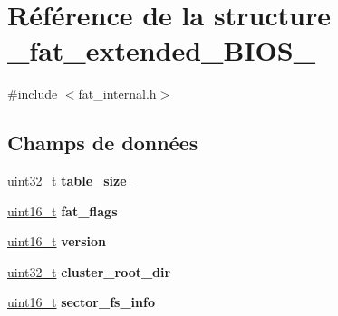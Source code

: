 \hypertarget{struct__fat__extended__BIOS__32}{\section{Référence de la structure \-\_\-fat\-\_\-extended\-\_\-\-B\-I\-O\-S\-\_}
\label{struct__fat__extended__BIOS__32}
}


{\ttfamily \#include $<$fat\-\_\-internal.\-h$>$}

\subsection*{Champs de données}
\begin{DoxyCompactItemize}
\item 
\hypertarget{struct__fat__extended__BIOS__32_afe9918174f4b717fe9ba858b792b6b76}{\hyperlink{kernel_2include_2types_8h_a33594304e786b158f3fb30289278f5af}{uint32\-\_\-t} {\bfseries table\-\_\-size\-\_}}\label{struct__fat__extended__BIOS__32_afe9918174f4b717fe9ba858b792b6b76}

\item 
\hypertarget{struct__fat__extended__BIOS__32_a58bc295c5eec01f9daec08d84340817e}{\hyperlink{kernel_2include_2types_8h_adf4d876453337156dde61095e1f20223}{uint16\-\_\-t} {\bfseries fat\-\_\-flags}}\label{struct__fat__extended__BIOS__32_a58bc295c5eec01f9daec08d84340817e}

\item 
\hypertarget{struct__fat__extended__BIOS__32_a9eb3b046449e1e1c868e1ecb1d6a9fe2}{\hyperlink{kernel_2include_2types_8h_adf4d876453337156dde61095e1f20223}{uint16\-\_\-t} {\bfseries version}}\label{struct__fat__extended__BIOS__32_a9eb3b046449e1e1c868e1ecb1d6a9fe2}

\item 
\hypertarget{struct__fat__extended__BIOS__32_a78cf2bb3768b41a3b054d6c71d5c61e7}{\hyperlink{kernel_2include_2types_8h_a33594304e786b158f3fb30289278f5af}{uint32\-\_\-t} {\bfseries cluster\-\_\-root\-\_\-dir}}\label{struct__fat__extended__BIOS__32_a78cf2bb3768b41a3b054d6c71d5c61e7}

\item 
\hypertarget{struct__fat__extended__BIOS__32_a38e8b2efc3921f696d435b878fc85007}{\hyperlink{kernel_2include_2types_8h_adf4d876453337156dde61095e1f20223}{uint16\-\_\-t} {\bfseries sector\-\_\-fs\-\_\-info}}\label{struct__fat__extended__BIOS__32_a38e8b2efc3921f696d435b878fc85007}


\end{DoxyCompactItemize}
